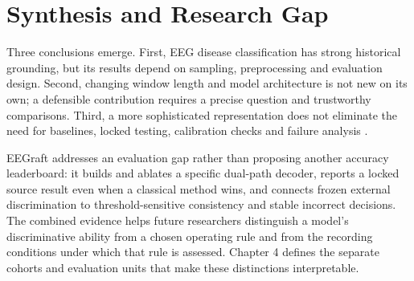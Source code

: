 \section{Synthesis and Research Gap}
Three conclusions emerge. First, EEG disease classification has strong historical grounding, but its results depend on sampling, preprocessing and evaluation design. Second, changing window length and model architecture is not new on its own; a defensible contribution requires a precise question and trustworthy comparisons. Third, a more sophisticated representation does not eliminate the need for baselines, locked testing, calibration checks and failure analysis \cite{miltiadous2026benchmark,xiong2026,guo2017calibration}.

EEGraft addresses an evaluation gap rather than proposing another accuracy leaderboard: it builds and ablates a specific dual-path decoder, reports a locked source result even when a classical method wins, and connects frozen external discrimination to threshold-sensitive consistency and stable incorrect decisions. The combined evidence helps future researchers distinguish a model's discriminative ability from a chosen operating rule and from the recording conditions under which that rule is assessed. Chapter 4 defines the separate cohorts and evaluation units that make these distinctions interpretable.\par
